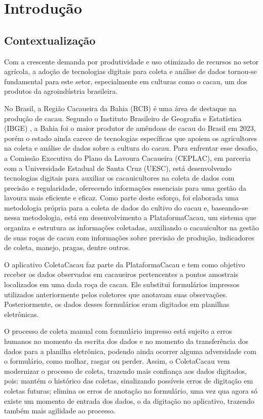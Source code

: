 \chapter{Introdução}

\section{Contextualização}
\vspace{-0.65em}
Com a crescente demanda por produtividade e uso otimizado de recursos no setor agrícola, a adoção de tecnologias digitais para coleta e análise de dados tornou-se fundamental para este setor, especialmente em culturas como o cacau, um dos produtos da agroindústria brasileira.

No Brasil, a Região Cacaueira da Bahia (RCB) é uma área de destaque na produção de cacau. Segundo o Instituto Brasileiro de Geografia e Estatística (IBGE) \cite{IBGE} , a Bahia foi o maior produtor de amêndoas de cacau do Brasil em 2023, porém o estado ainda carece de tecnologias específicas que apoiem os agricultores na coleta e análise de dados sobre a cultura do cacau. Para enfrentar esse desafio, a Comissão Executiva do Plano da Lavoura Cacaueira (CEPLAC), em parceria com a Universidade Estadual de Santa Cruz (UESC), está desenvolvendo tecnologias digitais para auxiliar os cacauicultores na coleta de dados com precisão e regularidade, oferecendo informações essenciais para uma gestão da lavoura mais eficiente e eficaz. Como parte deste esforço, foi elaborada uma metodologia própria para a coleta de dados do cultivo do cacau e, baseando-se nessa metodologia, está em desenvolvimento a PlataformaCacau, um sistema que organiza e estrutura as informações coletadas, auxiliando o cacauicultor na gestão de suas roças de cacau com informações sobre previsão de produção, indicadores de coleta,  manejo, pragas, dentre outros. 

O aplicativo ColetaCacau \cite{OliveiraSerra2022} faz parte da PlataformaCacau \cite{AdrielPlataC} e tem como objetivo receber os dados observados em cacaueiros pertencentes a pontos amostrais localizados em uma dada roça de cacau. Ele substitui formulários impressos utilizados anteriormente pelos coletores que anotavam suas observações. Posteriormente, os dados desses formulários eram digitados em planilhas eletrônicas. 

O processo de coleta manual com formulário impresso está sujeito a erros humanos no momento da escrita dos dados e no momento da transferência dos dados para a planilha eletrônica, podendo ainda ocorrer alguma adversidade com o formulário, como molhar, rasgar ou perder. Assim, o ColetaCacau vem modernizar o processo de coleta, trazendo mais confiança aos dados digitados, pois: mantém o histórico das coletas, sinalizando possíveis erros de digitação em coletas futuras; elimina os erros de anotação no formulário, uma vez qua agora só existe um momento de entrada dos dados, o da digitação no aplicativo, trazendo também mais agilidade ao processo.

